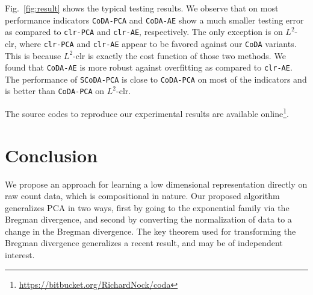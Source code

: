 \documentclass{article}
\begin{document}

Fig.~\ref{fig:result} shows the typical testing results. We observe
that on most performance indicators \texttt{CoDA-PCA} and \texttt{CoDA-AE}
show a much smaller testing error as compared to \texttt{clr-PCA} and \texttt{clr-AE}, respectively.
The only exception is on $L^2$-clr, where \texttt{clr-PCA} and \texttt{clr-AE}
appear to be favored against our \texttt{CoDA} variants. This is because $L^2$-clr is
exactly the cost function of those two methods.
We found that \texttt{CoDA-AE} is more robust against overfitting as compared to \texttt{clr-AE}.
The performance of \texttt{SCoDA-PCA} is close to \texttt{CoDA-PCA} on most
of the indicators and is better than \texttt{CoDA-PCA} on $L^2$-clr.


The source codes to reproduce our experimental results are available online\footnote{\url{https://bitbucket.org/RichardNock/coda}}.

\section{Conclusion}

We propose an approach for learning a low dimensional representation
directly on raw count data, which is compositional in nature.
Our proposed algorithm generalizes PCA in two ways, first by going to the exponential
family via the Bregman divergence, and second by converting the normalization of
data to a change in the Bregman divergence. The key theorem used for transforming
the Bregman divergence generalizes a recent result, and may be of independent interest.
\end{document}
